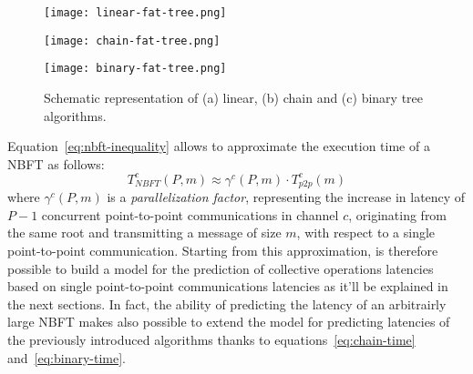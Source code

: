 \documentclass[../main.tex]{subfiles}
\begin{document}
\begin{figure}[h]
    \centering
    \begin{minipage}{\textwidth}
        \centering
        \texttt{[image: linear-fat-tree.png]}
    \end{minipage}
    
    \begin{minipage}{0.4\textwidth}
        \centering
        \texttt{[image: chain-fat-tree.png]}
    \end{minipage}\hfill
    \begin{minipage}{0.6\textwidth}
        \centering
        \texttt{[image: binary-fat-tree.png]}
    \end{minipage}
    \caption{Schematic representation of (a) linear, (b) chain and (c) binary tree algorithms.}
    \label{fig:algorithms}
\end{figure}

Equation~\ref{eq:nbft-inequality} allows to approximate the execution time of a NBFT as follows:
\begin{equation}\label{eq:nbft-approx}
    T^{c}_{NBFT}(P,m) \approx \gamma^{c}(P,m) \cdot T^{c}_{p2p}(m)
\end{equation}
where $\gamma^{c}(P,m)$ is a \textit{parallelization factor}, representing the increase in latency of $P-1$ concurrent point-to-point communications in channel $c$, originating from the same root and transmitting a message of size $m$, with respect to a single point-to-point communication. Starting from this approximation, is therefore possible to build a model for the prediction of collective operations latencies based on single point-to-point communications latencies as it'll be explained in the next sections. In fact, the ability of predicting the latency of an arbitrairly large NBFT makes also possible to extend the model for predicting latencies of the previously introduced algorithms thanks to equations~\ref{eq:chain-time} and~\ref{eq:binary-time}.\\
\end{document}
